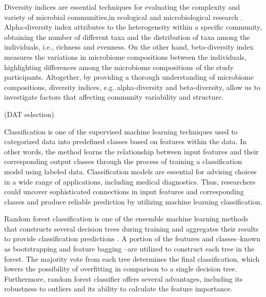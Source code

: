 \documentclass[11pt, a4paper, onecolumn, oneside]{report}
\begin{document}
        Diversity indices are essential techniques for evaluating the complexity and variety of microbial communities,in ecological and microbiological research \cite{Diversity-1, Diversity-2}. Alpha-diversity index attributes to the heterogeneity within a specific community, obtaining the number of different taxa and the distribution of taxa among the individuals, i.e., richness and evenness. On the other hand, beta-diversity index measures the variations in microbiome compositions between the individuals, highlighting differences among the microbiome compositions of the study participants. Altogether, by providing a thorough understanding of microbiome compositions, diversity indices, e.g. alpha-diversity and beta-diversity, allow us to investigate factors that affecting community variability and structure.

        (DAT selection)

        Classification is one of the supervised machine learning techniques used to categorized data into predefined classes based on features within the data. In other words, the method learns the relationship between input features and their corresponding output classes through the process of training a classification model using labeled data. Classification models are essential for advising choices in a wide range of applications, including medical diagnostics. Thus, researchers could uncover sophisticated connections in input features and corresponding classes and produce reliable prediction by utilizing machine learning classification.

        Random forest classification is one of the ensemble machine learning methods that constructs several decision trees during training and aggregates their results to provide classification predictions \cite{RF-1}. A portion of the features and classes--known as bootstrapping \cite{RF-2, RF-3, RF-4} and feature bagging \cite{RF-5, RF-6, RF-7}--are utilized to construct each tree in the forest. The majority vote from each tree determines the final classification, which lowers the possibility of overfitting in comparison to a single decision tree. Furthermore, random forest classifier offers several advantages, including its robustness to outliers and its ability to calculate the feature importance.
\end{document}
